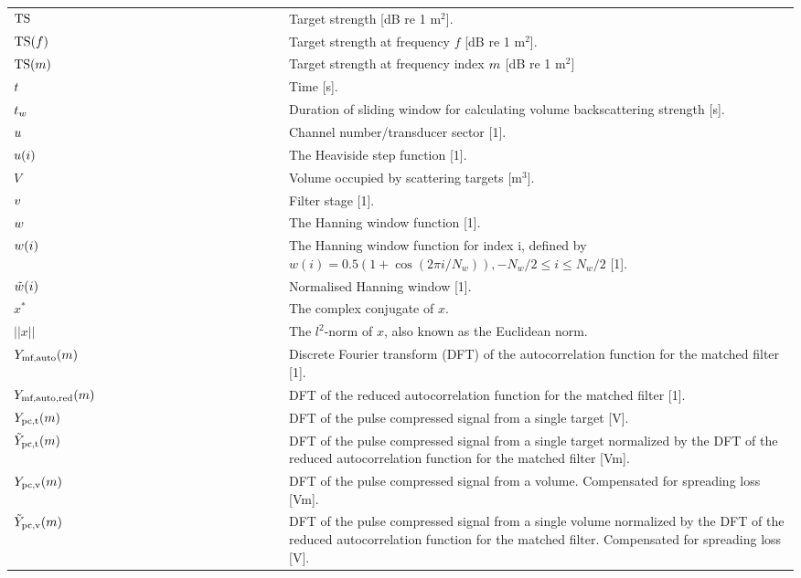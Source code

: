 \documentclass[12pt,a4paper]{article}
\begin{document}
\begin{longtable}{p{0.15\linewidth} p{0.2\linewidth} p{0.65\linewidth} }
$\textrm{TS}$ & & Target strength [dB re 1 $\textrm{m}^2$].\\
$\textrm{TS}(f)$ & & Target strength at frequency $f$ [dB re 1 $\textrm{m}^2$].\\
$\textrm{TS}(m)$ & & Target strength at frequency index $m$ [dB re 1 $\textrm{m}^{2}$]\\

$t$ & &  Time [s].\\
$t_w$ & & Duration of sliding window for calculating volume backscattering strength [s].\\

$u$ & & Channel number/transducer sector [1].\\
$u(i)$ & & The Heaviside step function [1]. \\
$V$ & & Volume occupied by scattering targets [$\textrm{m}^3$].\\
$v$ & & Filter stage [1].\\

$w$ & & The Hanning window function [1].\\
$w(i)$ & & The Hanning window function for index i, defined by $w(i) = 0.5(1+\cos (2\pi i /N_w)), -N_w/2 \leq i \leq N_w/2$ [1].\\
$\tilde{w}(i)$ & & Normalised Hanning window [1].\\

$x^*$ & & The complex conjugate of $x$.\\
$||x||$ & & The $l^2$-norm of $x$, also known as the Euclidean norm.\\

$Y_{\textrm{mf,auto}}(m)$ & & Discrete Fourier transform (DFT) of the autocorrelation function for the matched filter [1].\\
$Y_{\textrm{mf,auto,red}}(m)$ & & DFT of the reduced autocorrelation function for the matched filter [1].\\
$Y_{\textrm{pc,t}}(m)$ & & DFT of the pulse compressed signal from a single target [V].\\
$\tilde{Y}_{\textrm{pc,t}}(m)$ & & DFT of the pulse compressed signal from a single target 
normalized by the DFT of the reduced autocorrelation function for the matched filter [Vm].\\
$Y_{\textrm{pc,v}}(m)$ & & DFT of the pulse compressed signal from a volume. Compensated for spreading loss [Vm].\\
$\tilde{Y}_{\textrm{pc,v}}(m)$ & & DFT of the pulse compressed signal from a single volume normalized by the DFT of the reduced autocorrelation function for the matched filter.  Compensated for spreading loss [V].\\


\end{longtable}
\end{document}
